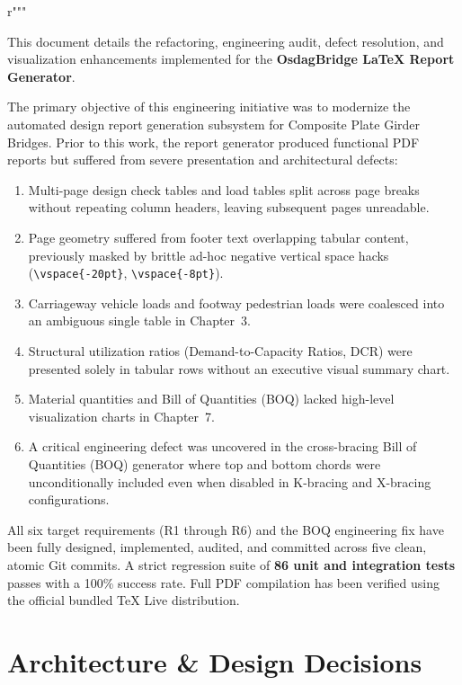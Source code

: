 r"""\documentclass[11pt,a4paper]{article}
\begin{document}
This document details the refactoring, engineering audit, defect resolution, and visualization enhancements implemented for the \textbf{OsdagBridge LaTeX Report Generator}.

The primary objective of this engineering initiative was to modernize the automated design report generation subsystem for Composite Plate Girder Bridges. Prior to this work, the report generator produced functional PDF reports but suffered from severe presentation and architectural defects:
\begin{enumerate}
    \item Multi-page design check tables and load tables split across page breaks without repeating column headers, leaving subsequent pages unreadable.
    \item Page geometry suffered from footer text overlapping tabular content, previously masked by brittle ad-hoc negative vertical space hacks (\texttt{\textbackslash vspace\{-20pt\}}, \texttt{\textbackslash vspace\{-8pt\}}).
    \item Carriageway vehicle loads and footway pedestrian loads were coalesced into an ambiguous single table in Chapter~3.
    \item Structural utilization ratios (Demand-to-Capacity Ratios, DCR) were presented solely in tabular rows without an executive visual summary chart.
    \item Material quantities and Bill of Quantities (BOQ) lacked high-level visualization charts in Chapter~7.
    \item A critical engineering defect was uncovered in the cross-bracing Bill of Quantities (BOQ) generator where top and bottom chords were unconditionally included even when disabled in K-bracing and X-bracing configurations.
\end{enumerate}

All six target requirements (R1 through R6) and the BOQ engineering fix have been fully designed, implemented, audited, and committed across five clean, atomic Git commits. A strict regression suite of \textbf{86 unit and integration tests} passes with a 100\% success rate. Full PDF compilation has been verified using the official bundled TeX Live distribution.

\section{Architecture \& Design Decisions}
\end{document}
